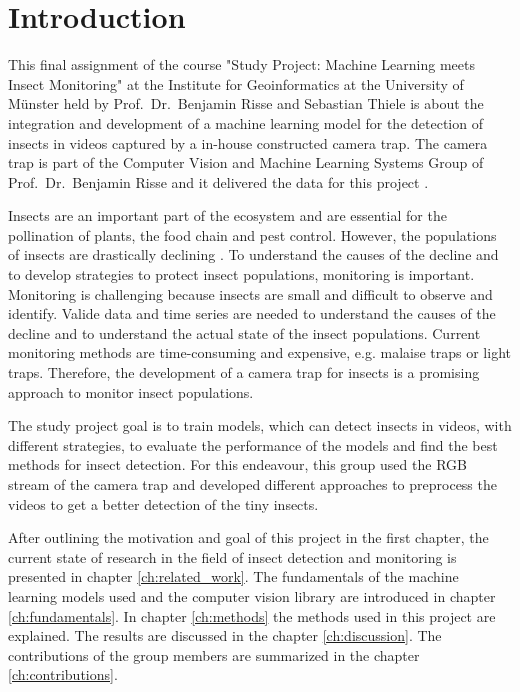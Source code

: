 \chapter{Introduction}
\label{ch:introduction}


This final assignment of the course "Study Project: Machine Learning meets Insect Monitoring" at the Institute for Geoinformatics at the University of Münster held by Prof.\ Dr.\ Benjamin Risse and Sebastian Thiele is about the integration and development of a machine learning model for the detection of insects in videos captured by a in-house constructed camera trap. The camera trap is part of the Computer Vision and Machine Learning Systems Group of Prof.\ Dr.\ Benjamin Risse and it delivered the data for this project \cite{ComputerVisionAndMachineLearningSystems}.

Insects are an important part of the ecosystem and are essential for the pollination of plants, the food chain and pest control. However, the populations of insects are drastically declining \cite{wagner2021insect}. To understand the causes of the decline and to develop strategies to protect insect populations, monitoring is important. Monitoring is challenging because insects are small and difficult to observe and identify. Valide data and time series are needed to understand the causes of the decline and to understand the actual state of the insect populations. Current monitoring methods are time-consuming and expensive, e.g. malaise traps or light traps. Therefore, the development of a camera trap for insects is a promising approach to monitor insect populations.

The study project goal is to train models, which can detect insects in videos, with different strategies, to evaluate the performance of the models and find the best methods for insect detection. For this endeavour, this group used the RGB stream of the camera trap and developed different approaches to preprocess the videos to get a better detection of the tiny insects.

After outlining the motivation and goal of this project in the first chapter, the current state of research in the field of insect detection and monitoring is presented in chapter \ref{ch:related_work}. The fundamentals of the machine learning models used and the computer vision library are introduced in chapter \ref{ch:fundamentals}. In chapter \ref{ch:methods} the methods used in this project are explained. The results are discussed in the chapter \ref{ch:discussion}. The contributions of the group members are summarized in the chapter \ref{ch:contributions}.
